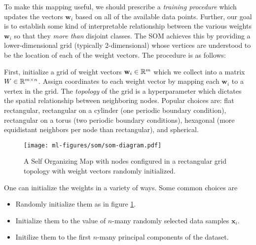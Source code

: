 To make this mapping useful, we should prescribe a \textit{training procedure} which updates the vectors $\mathbf{w}_i$ based on all of the available data points. Further, our goal is to establish some kind of interpretable relationship between the various weights $\mathbf{w}_i$ so that they \textit{more than} disjoint classes. The SOM achieves this by providing a lower-dimensional grid (typically 2-dimensional) whose vertices are understood to be the location of each of the weight vectors. The procedure is as follows:

First, initialize a grid of weight vectors $\mathbf{w}_i\in\mathbb{R}^m$ which we collect into a matrix $W\in\mathbb{R}^{m\times n}$. Assign coordinates to each weight vector by mapping each $\mathbf{w}_i$ to a vertex in the grid. The \textit{topology} of the grid is a hyperparameter which dictates the spatial relationship between neighboring nodes. Popular choices are: flat rectangular, rectangular on a cylinder (one periodic boundary condition), rectangular on a torus (two periodic boundary conditions), hexagonal (more equidistant neighbors per node than rectangular), and spherical.
\begin{figure}[h]
  \centering
  \texttt{[image: ml-figures/som/som-diagram.pdf]}
  \caption{A Self Organizing Map with nodes configured in a rectangular grid topology with weight vectors randomly initialized.}
  \label{fig:som-diagram}
\end{figure}
One can initialize the weights in a variety of ways. Some common choices are
\begin{itemize}
\item Randomly initialize them as in figure \ref{fig:som-diagram}.
\item Initialize them to the value of $n$-many randomly selected data samples $\mathbf{x}_i$.
\item Initilize them to the first $n$-many principal components of the dataset.
\end{itemize}

